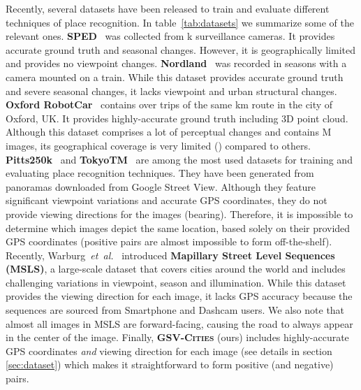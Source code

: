 \documentclass{article}
\newcommand{\etal}{\textit{et~al.}}
\begin{document}
Recently, 
several datasets have been released to train and evaluate different techniques of place recognition. In table~\ref{tab:datasets} we summarize some of the relevant ones. \textbf{SPED}~\cite{chen2017deep} was collected from k surveillance cameras. It provides accurate ground truth and seasonal changes. However, it is geographically limited and provides no viewpoint changes. \textbf{Nordland}~\cite{olid2018single} was recorded in  seasons with a camera mounted on a train. While this dataset provides accurate ground truth and severe seasonal changes, it lacks viewpoint and urban structural changes. \textbf{Oxford RobotCar}~\cite{maddern20171} contains over  trips of the same  km route in the city of Oxford, UK. It provides highly-accurate ground truth including 3D point cloud. Although this dataset comprises a lot of perceptual changes and contains M images, its geographical coverage is very limited () compared to others. \textbf{Pitts250k}~\cite{torii2013visual} and \textbf{TokyoTM}~\cite{torii201524} are among the most used datasets for training and evaluating place recognition techniques. They have been generated from panoramas downloaded from Google Street View. Although they feature significant viewpoint variations and accurate GPS coordinates, they do not provide viewing directions for the images (bearing). Therefore, it is impossible to determine which images depict the same location, based solely on their provided GPS coordinates (positive pairs are almost impossible to form off-the-shelf). Recently, Warburg~\etal~\cite{warburg2020mapillary} introduced \textbf{Mapillary Street Level Sequences (MSLS)}, a large-scale dataset that covers  cities around the world and includes challenging variations in viewpoint, season and illumination. While this dataset provides the viewing direction for each image, it lacks GPS accuracy because the sequences are sourced from Smartphone and Dashcam users. We also note that almost all images in MSLS are forward-facing, causing the road to always appear in the center of the image. Finally, \textsc{\textbf{GSV-Cities}} (ours) includes highly-accurate GPS coordinates \emph{and} viewing direction for each image (see details in section \ref{sec:dataset}) which makes it straightforward to form positive (and negative) pairs.
\end{document}
